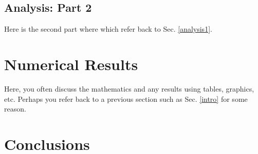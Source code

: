 \documentclass{article}
\begin{document}
\subsection{Analysis: Part 2}\label{analysis2}
Here is the second part where which refer back to Sec. \ref{analysis1}.

\section{Numerical Results}\label{NumRes}
 Here, you often discuss the mathematics and any results using tables, graphics, etc. Perhaps you refer back to a previous section such as Sec. \ref{intro} for some reason.
 
 \section{Conclusions}\label{Conc}
 


\end{document}
